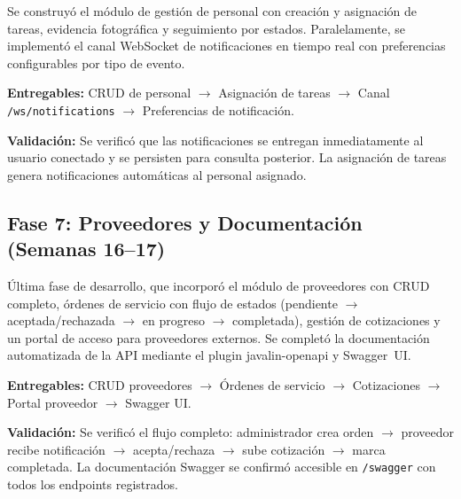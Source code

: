Se construyó el módulo de gestión de personal con creación y asignación de tareas, evidencia fotográfica y seguimiento por estados. Paralelamente, se implementó el canal WebSocket de notificaciones en tiempo real con preferencias configurables por tipo de evento.

\textbf{Entregables:} CRUD de personal $\rightarrow$ Asignación de tareas $\rightarrow$ Canal \texttt{/ws/notifications} $\rightarrow$ Preferencias de notificación.

\textbf{Validación:} Se verificó que las notificaciones se entregan inmediatamente al usuario conectado y se persisten para consulta posterior. La asignación de tareas genera notificaciones automáticas al personal asignado.

\subsection{Fase 7: Proveedores y Documentación (Semanas 16--17)}

Última fase de desarrollo, que incorporó el módulo de proveedores con CRUD completo, órdenes de servicio con flujo de estados (pendiente $\rightarrow$ aceptada/rechazada $\rightarrow$ en progreso $\rightarrow$ completada), gestión de cotizaciones y un portal de acceso para proveedores externos. Se completó la documentación automatizada de la API mediante el plugin javalin-openapi y Swagger~UI.

\textbf{Entregables:} CRUD proveedores $\rightarrow$ Órdenes de servicio $\rightarrow$ Cotizaciones $\rightarrow$ Portal proveedor $\rightarrow$ Swagger UI.

\textbf{Validación:} Se verificó el flujo completo: administrador crea orden $\rightarrow$ proveedor recibe notificación $\rightarrow$ acepta/rechaza $\rightarrow$ sube cotización $\rightarrow$ marca completada. La documentación Swagger se confirmó accesible en \texttt{/swagger} con todos los endpoints registrados.